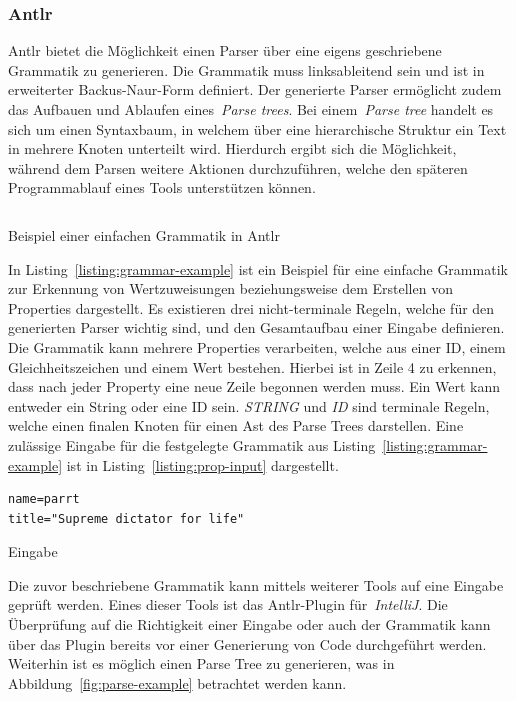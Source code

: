 \subsubsection{Antlr}\label{subsubsec:antlr}
\ac{Antlr} bietet die Möglichkeit einen Parser über eine eigens geschriebene Grammatik zu generieren.
Die Grammatik muss linksableitend sein und ist in erweiterter Backus-Naur-Form definiert.
Der generierte Parser ermöglicht zudem das Aufbauen und Ablaufen eines~\textit{Parse trees}.
Bei einem~\textit{Parse tree} handelt es sich um einen Syntaxbaum, in welchem über eine hierarchische Struktur ein Text in mehrere Knoten unterteilt wird.
Hierdurch ergibt sich die Möglichkeit, während dem Parsen weitere Aktionen durchzuführen, welche den späteren Programmablauf eines Tools unterstützen können.

\begin{listing}[!ht]
    \inputminted{antlr-java}{listings/2.2.1/AntlrExample.g4}
    \caption{Beispiel einer einfachen Grammatik in Antlr}
    \label{listing:grammar-example}
\end{listing}

In Listing~\ref{listing:grammar-example} ist ein Beispiel für eine einfache Grammatik zur Erkennung von Wertzuweisungen beziehungsweise dem Erstellen von
Properties dargestellt\cite*{antlrOrg}.
Es existieren drei nicht-terminale Regeln, welche für den generierten Parser wichtig sind, und den Gesamtaufbau einer Eingabe definieren.
Die Grammatik kann mehrere Properties verarbeiten, welche aus einer ID, einem Gleichheitszeichen und einem Wert bestehen.
Hierbei ist in Zeile 4 zu erkennen, dass nach jeder Property eine neue Zeile begonnen werden muss.
Ein Wert kann entweder ein String oder eine ID sein.
\textit{STRING} und \textit{ID} sind terminale Regeln, welche einen finalen Knoten für einen Ast des Parse Trees darstellen.
Eine zulässige Eingabe für die festgelegte Grammatik aus Listing~\ref{listing:grammar-example} ist in Listing~\ref{listing:prop-input} dargestellt.

\begin{listing}[!ht]
    \begin{verbatim}
name=parrt
title="Supreme dictator for life"

    \end{verbatim}
    \caption{Eingabe}
    \label{listing:prop-input}
\end{listing}

Die zuvor beschriebene Grammatik kann mittels weiterer Tools auf eine Eingabe geprüft werden.
Eines dieser Tools ist das Antlr-Plugin für~\textit{IntelliJ}.
Die Überprüfung auf die Richtigkeit einer Eingabe oder auch der Grammatik kann über das Plugin bereits vor einer Generierung von Code durchgeführt werden.
Weiterhin ist es möglich einen Parse Tree zu generieren, was in Abbildung~\ref{fig:parse-example} betrachtet werden kann.

